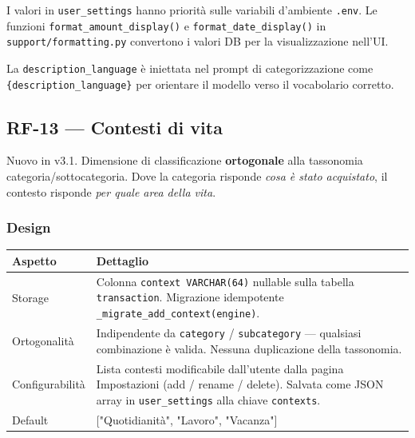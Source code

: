 \documentclass[11pt, a4paper]{article}
\begin{document}
I valori in \texttt{user\_settings} hanno priorità sulle variabili d'ambiente
\texttt{.env}. Le funzioni \texttt{format\_amount\_display()} e
\texttt{format\_date\_display()} in \texttt{support/formatting.py} convertono i
valori DB per la visualizzazione nell'UI.

La \texttt{description\_language} è iniettata nel prompt di categorizzazione come
\texttt{\{description\_language\}} per orientare il modello verso il vocabolario
corretto.


\subsection{RF-13 --- Contesti di vita}
\label{sec:rf13}

\begin{v31box}
Nuovo in v3.1. Dimensione di classificazione \textbf{ortogonale} alla tassonomia
categoria/sottocategoria. Dove la categoria risponde \emph{cosa è stato acquistato},
il contesto risponde \emph{per quale area della vita}.
\end{v31box}

\subsubsection{Design}

\begin{center}
\begin{tabular}{@{}L{4cm} L{9cm}@{}}
\toprule
\textbf{Aspetto} & \textbf{Dettaglio} \\
\midrule
Storage             & Colonna \texttt{context VARCHAR(64)} nullable sulla tabella
                      \texttt{transaction}. Migrazione idempotente
                      \texttt{\_migrate\_add\_context(engine)}. \\[3pt]
Ortogonalità        & Indipendente da \texttt{category} / \texttt{subcategory} ---
                      qualsiasi combinazione è valida. Nessuna duplicazione della
                      tassonomia. \\[3pt]
Configurabilità     & Lista contesti modificabile dall'utente dalla pagina Impostazioni
                      (add / rename / delete). Salvata come JSON array in
                      \texttt{user\_settings} alla chiave \texttt{contexts}. \\[3pt]
Default             & {[}"Quotidianità", "Lavoro", "Vacanza"{]} \\
\bottomrule
\end{tabular}
\end{center}
\end{document}
